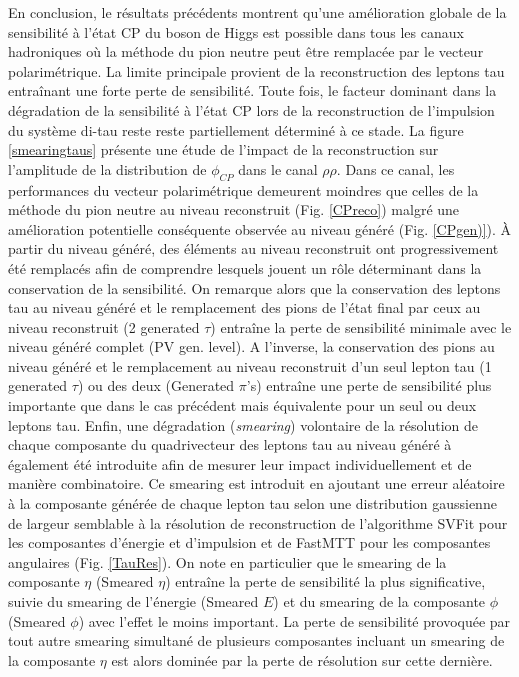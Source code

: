 En conclusion, le résultats précédents montrent qu'une amélioration globale de la sensibilité à l'état CP du boson de Higgs est possible dans tous les canaux hadroniques où la méthode du pion neutre peut être remplacée par le vecteur polarimétrique. La limite principale provient de la reconstruction des leptons tau entraînant une forte perte de sensibilité. Toute fois, le facteur dominant dans la dégradation de la sensibilité à l'état CP lors de la reconstruction de l'impulsion du système di-tau reste reste partiellement déterminé à ce stade. La figure \ref{smearingtaus} présente une étude de l'impact de la reconstruction sur l'amplitude de la distribution de $\phi_{CP}$ dans le canal $\rho\rho$. Dans ce canal, les performances du vecteur polarimétrique demeurent moindres que celles de la méthode du pion neutre au niveau reconstruit (Fig. \ref{CPreco}) malgré une amélioration potentielle conséquente observée au niveau généré (Fig. \ref{CPgen)}). À partir du niveau généré, des éléments au niveau reconstruit ont progressivement été remplacés afin de comprendre lesquels jouent un rôle déterminant dans la conservation de la sensibilité. On remarque alors que la conservation des leptons tau au niveau généré et le remplacement des pions de l'état final par ceux au niveau reconstruit (2 generated $\tau$) entraîne la perte de sensibilité minimale avec le niveau généré complet (PV gen. level). A l'inverse, la conservation des pions au niveau généré et le remplacement au niveau reconstruit d'un seul lepton tau (1 generated $\tau$) ou des deux (Generated $\pi$'s) entraîne une perte de sensibilité plus importante que dans le cas précédent mais équivalente pour un seul ou deux leptons tau. Enfin, une dégradation (\textit{smearing}) volontaire de la résolution de chaque composante du quadrivecteur des leptons tau au niveau généré à également été introduite afin de mesurer leur impact individuellement et de manière combinatoire. Ce smearing est introduit en ajoutant une erreur aléatoire à la composante générée de chaque lepton tau selon une distribution gaussienne de largeur semblable à la résolution de reconstruction de l'algorithme SVFit pour les composantes d'énergie et d'impulsion et de FastMTT pour les composantes angulaires (Fig. \ref{TauRes}). On note en particulier que le smearing de la composante $\eta$ (Smeared $\eta$) entraîne la perte de sensibilité la plus significative, suivie du smearing de l'énergie (Smeared $E$) et du smearing de la composante $\phi$ (Smeared $\phi$) avec l'effet le moins important. La perte de sensibilité provoquée par tout autre smearing simultané de plusieurs composantes incluant un smearing de la composante $\eta$ est alors dominée par la perte de résolution sur cette dernière.

